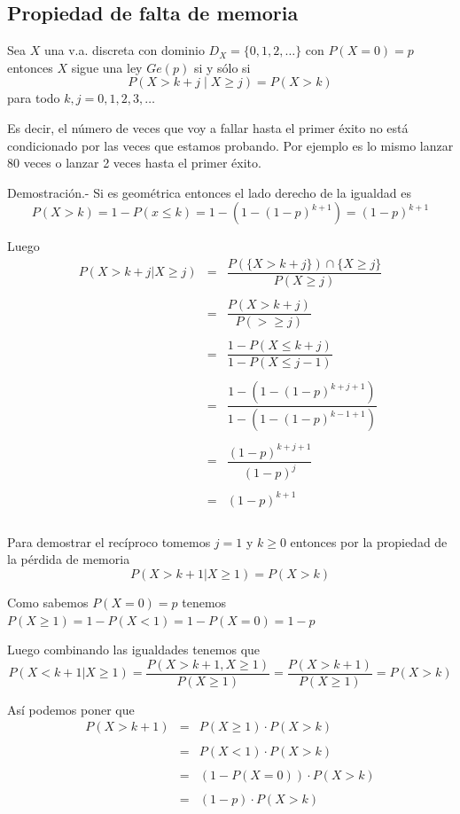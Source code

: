 \documentclass[
]{article}
\begin{document}
\hypertarget{propiedad-de-falta-de-memoria}{%
\subsection{Propiedad de falta de
memoria}\label{propiedad-de-falta-de-memoria}}

Sea \(X\) una v.a. discreta con dominio
\(D_X = \lbrace0,1,2, \ldots\rbrace\) con \(P(X=0) = p\) entonces \(X\)
sigue una ley \(Ge(p)\) si y sólo si
\[P(X> k + j \;|\; X\geq j) = P(X>k)\] para todo
\(k,j = 0,1,2,3,\ldots\)

Es decir, el número de veces que voy a fallar hasta el primer éxito no
está condicionado por las veces que estamos probando. Por ejemplo es lo
mismo lanzar 80 veces o lanzar 2 veces hasta el primer éxito.

Demostración.- Si es geométrica entonces el lado derecho de la igualdad
es \[P(X>k) = 1 - P(x\leq k) = 1 - (1-(1-p)^{k+1}) = (1-p)^{k+1}\]

Luego \[\begin{array}{rcl}
  P(X>k+j | X\geq j)&=&\dfrac{P(\lbrace X>k+j\rbrace)\cap \lbrace X\geq j\rbrace}{P(X\geq j)}\\\\
  &=&\dfrac{P(X>k+j)}{P(>\geq j)}\\\\
  &=&\dfrac{1-P(X\leq k+j)}{1-P(X\leq j-1)}\\\\
  &=&\dfrac{1-(1-(1-p)^{k+j+1})}{1-(1-(1-p)^{k-1+1})}\\\\
  &=&\dfrac{(1-p)^{k+j+1}}{(1-p)^j}\\\\
  &=&(1-p)^{k+1}\\\\
\end{array}\]

Para demostrar el recíproco tomemos \(j=1\) y \(k\geq 0\) entonces por
la propiedad de la pérdida de memoria \[P(X>k+1 | X\geq 1) = P(X>k)\]

Como sabemos \(P(X=0)=p\) tenemos
\(P(X\geq 1) = 1 - P(X<1) = 1-P(X=0) = 1-p\)

Luego combinando las igualdades tenemos que
\[P(X<k+1 | X\geq 1) = \dfrac{P(X>k+1, X\geq 1)}{P(X\geq 1)} = \dfrac{P(X>k+1)}{P(X\geq 1)} = P(X>k)\]

Así podemos poner que \[\begin{array}{rcl}
  P(X>k+1)&=&P(X\geq 1)\cdot P(X>k)\\\\
  &=&P(X<1)\cdot P(X>k)\\\\
  &=&(1-P(X=0))\cdot P(X>k)\\\\
  &=&(1-p)\cdot P(X>k)\\\\
\end{array}\]
\end{document}
